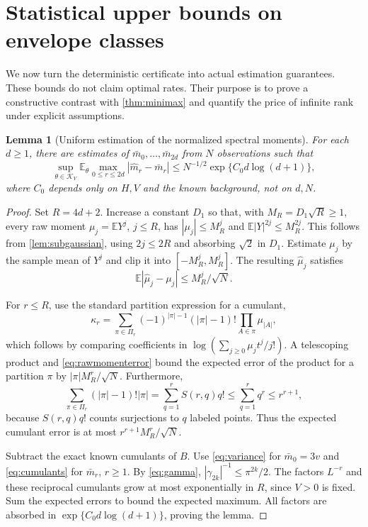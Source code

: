 \documentclass[11pt,letterpaper]{article}
\numberwithin{equation}{section}
\newtheorem{lemma}[theorem]{Lemma}
\theoremstyle{definition}
\theoremstyle{remark}
\newcommand{\E}{\mathbb E}
\newcommand{\K}{\mathcal K_V}
\begin{document}
\section{Statistical upper bounds on envelope classes}
\label{sec:rates}

We now turn the deterministic certificate into actual estimation guarantees.
These bounds do not claim optimal rates. Their purpose is to prove a
constructive contrast with \cref{thm:minimax} and quantify the price of
infinite rank under explicit assumptions.

\begin{lemma}[Uniform estimation of the normalized spectral moments]
\label{lem:empirical}
For each $d\ge1$, there are estimates of
$\bar m_0,\ldots,\bar m_{2d}$ from $N$ observations such that
\begin{equation}
 \sup_{\theta\in\K}\E_\theta
   \max_{0\le r\le2d}|\widehat m_r-\bar m_r|
 \le N^{-1/2}\exp\{C_0d\log(d+1)\},
 \label{eq:empirical}
\end{equation}
where $C_0$ depends only on $H,V$ and the known background, not on $d,N$.
\end{lemma}
\begin{proof}
Set $R=4d+2$. Increase a constant $D_1$ so that, with
$M_R=D_1\sqrt R\ge1$, every raw moment $\mu_j=\E Y^j$, $j\le R$, has
$|\mu_j|\le M_R^j$ and $\E|Y|^{2j}\le M_R^{2j}$.
This follows from \cref{lem:subgaussian}, using $2j\le2R$ and absorbing
$\sqrt2$ in $D_1$. Estimate $\mu_j$ by the sample mean of $Y^j$ and clip
it into $[-M_R^j,M_R^j]$. The resulting $\widehat\mu_j$ satisfies
\begin{equation}
 \E|\widehat\mu_j-\mu_j|\le M_R^j/\sqrt N.
 \label{eq:rawmomenterror}
\end{equation}

For $r\le R$, use the standard partition expression for a cumulant,
\begin{equation}
 \kappa_r=\sum_{\pi\in\Pi_r}(-1)^{|\pi|-1}(|\pi|-1)!
              \prod_{A\in\pi}\mu_{|A|},
 \label{eq:partitioncumulant}
\end{equation}
which follows by comparing coefficients in
$\log(\sum_{j\ge0}\mu_jt^j/j!)$.
A telescoping product and \eqref{eq:rawmomenterror} bound the expected error
of the product for a partition $\pi$ by $|\pi|M_R^r/\sqrt N$.
Furthermore,
\[
 \sum_{\pi\in\Pi_r}(|\pi|-1)!|\pi|
 =\sum_{q=1}^r S(r,q)q!\le\sum_{q=1}^r q^r\le r^{r+1},
\]
because $S(r,q)q!$ counts surjections to $q$ labeled points. Thus the
expected cumulant error is at most $r^{r+1}M_R^r/\sqrt N$.

Subtract the exact known cumulants of $B$. Use \eqref{eq:variance} for
$\bar m_0=3v$ and \eqref{eq:cumulants} for $\bar m_r$, $r\ge1$.
By \eqref{eq:gamma}, $|\gamma_{2k}|^{-1}\le\pi^{2k}/2$.
The factors $L^{-r}$ and these reciprocal cumulants grow at most
exponentially in $R$, since $V>0$ is fixed. Sum the expected errors to bound
the expected maximum. All factors are absorbed in
$\exp\{C_0d\log(d+1)\}$, proving the lemma.
\end{proof}
\end{document}
